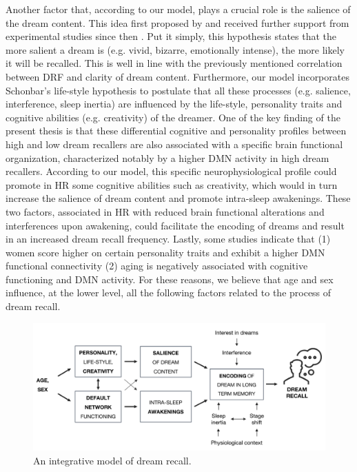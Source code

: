 Another factor that, according to our model, plays a crucial role is the salience of the dream content. This idea first proposed by \citet{cohen_test_1974} and received further support from experimental studies since then \citep{cipolli_bizarreness_1993, schredl_emotions_1998}. Put it simply, this hypothesis states that the more salient a dream is (e.g. vivid, bizarre, emotionally intense), the more likely it will be recalled. This is well in line with the previously mentioned correlation between DRF and clarity of dream content. Furthermore, our model incorporates Schonbar's life-style hypothesis \citeyearpar{schonbar_differential_1965} to postulate that all these processes (e.g. salience, interference, sleep inertia) are influenced by the life-style, personality traits and cognitive abilities (e.g. creativity) of the dreamer. One of the key finding of the present thesis is that these differential cognitive and personality profiles between high and low dream recallers are also associated with a specific brain functional organization, characterized notably by a higher DMN activity in high dream recallers. According to our model, this specific neurophysiological profile could promote in HR some cognitive abilities such as creativity, which would in turn increase the salience of dream content and promote intra-sleep awakenings. These two factors, associated in HR with reduced brain functional alterations and interferences upon awakening, could facilitate the encoding of dreams and result in an increased dream recall frequency. Lastly, some studies indicate that (1) women score higher on certain personality traits and exhibit a higher DMN functional connectivity (2) aging is negatively associated with cognitive functioning and DMN activity. For these reasons, we believe that age and sex influence, at the lower level, all the following factors related to the process of dream recall.

\begin{figure}[!htbp]
	\includegraphics[width=\textwidth]{Fig/Discussion/schema_dream_recall.png}
	\caption[An integrative model of dream recall]{An integrative model of dream recall.}
	\label{fig:disc:drf:model}
\end{figure}

